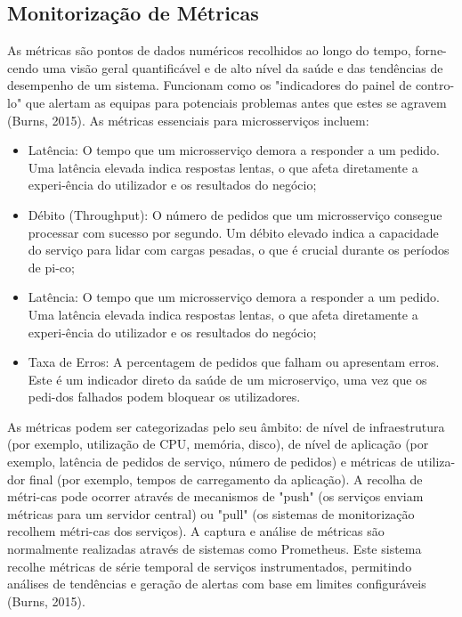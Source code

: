 \subsection{Monitorização de Métricas}

As métricas são pontos de dados numéricos recolhidos ao longo do tempo, forne-cendo uma visão geral quantificável e de alto nível da saúde e das tendências de desempenho de um sistema. Funcionam como os "indicadores do painel de contro-lo" que alertam as equipas para potenciais problemas antes que estes se agravem (Burns, 2015).
As métricas essenciais para microsserviços incluem:

\begin{itemize}
    \item Latência: O tempo que um microsserviço demora a responder a um pedido. Uma latência elevada indica respostas lentas, o que afeta diretamente a experi-ência do utilizador e os resultados do negócio;
    \item Débito (Throughput): O número de pedidos que um microsserviço consegue processar com sucesso por segundo. Um débito elevado indica a capacidade do serviço para lidar com cargas pesadas, o que é crucial durante os períodos de pi-co;
    \item Latência: O tempo que um microsserviço demora a responder a um pedido. Uma latência elevada indica respostas lentas, o que afeta diretamente a experi-ência do utilizador e os resultados do negócio;
    \item Taxa de Erros: A percentagem de pedidos que falham ou apresentam erros. Este é um indicador direto da saúde de um microserviço, uma vez que os pedi-dos falhados podem bloquear os utilizadores.
\end{itemize}

As métricas podem ser categorizadas pelo seu âmbito: de nível de infraestrutura (por exemplo, utilização de CPU, memória, disco), de nível de aplicação (por exemplo, latência de pedidos de serviço, número de pedidos) e métricas de utiliza-dor final (por exemplo, tempos de carregamento da aplicação). A recolha de métri-cas pode ocorrer através de mecanismos de "push" (os serviços enviam métricas para um servidor central) ou "pull" (os sistemas de monitorização recolhem métri-cas dos serviços).
A captura e análise de métricas são normalmente realizadas através de sistemas como Prometheus. Este sistema recolhe métricas de série temporal de serviços instrumentados, permitindo análises de tendências e geração de alertas com base em limites configuráveis (Burns, 2015).


